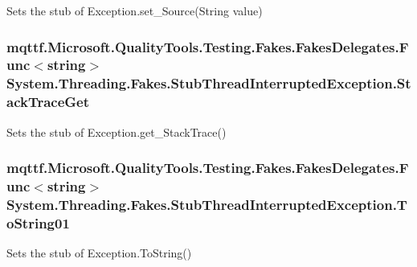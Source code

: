 Sets the stub of Exception.\-set\-\_\-\-Source(\-String value)

\hypertarget{class_system_1_1_threading_1_1_fakes_1_1_stub_thread_interrupted_exception_af334c22fb632c61fb31e67b1cd6b2632}{
\subsubsection[{Stack\-Trace\-Get}]{\setlength{\rightskip}{0pt plus 5cm}mqttf.\-Microsoft.\-Quality\-Tools.\-Testing.\-Fakes.\-Fakes\-Delegates.\-Func$<$string$>$ System.\-Threading.\-Fakes.\-Stub\-Thread\-Interrupted\-Exception.\-Stack\-Trace\-Get}}\label{class_system_1_1_threading_1_1_fakes_1_1_stub_thread_interrupted_exception_af334c22fb632c61fb31e67b1cd6b2632}


Sets the stub of Exception.\-get\-\_\-\-Stack\-Trace()

\hypertarget{class_system_1_1_threading_1_1_fakes_1_1_stub_thread_interrupted_exception_a1376660f99bc743879cd5e99432f6fc1}{
\subsubsection[{To\-String01}]{\setlength{\rightskip}{0pt plus 5cm}mqttf.\-Microsoft.\-Quality\-Tools.\-Testing.\-Fakes.\-Fakes\-Delegates.\-Func$<$string$>$ System.\-Threading.\-Fakes.\-Stub\-Thread\-Interrupted\-Exception.\-To\-String01}}\label{class_system_1_1_threading_1_1_fakes_1_1_stub_thread_interrupted_exception_a1376660f99bc743879cd5e99432f6fc1}


Sets the stub of Exception.\-To\-String()



